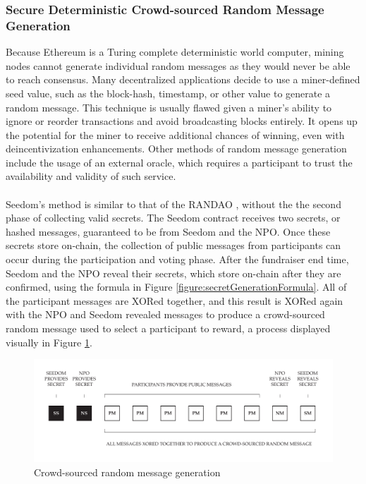 \documentclass[11pt]{article}
\begin{document}
\subsubsection{Secure Deterministic Crowd-sourced Random Message Generation}
\label{sec:secureDeterministicCrowdSourcedRandomMessageGeneration}

Because Ethereum is a Turing complete deterministic world computer, mining nodes cannot generate individual random messages as they would never be able to reach consensus. Many decentralized applications decide to use a miner-defined seed value, such as the block-hash, timestamp, or other value to generate a random message. This technique is usually flawed given a miner's ability to ignore or reorder transactions and avoid broadcasting blocks entirely. It opens up the potential for the miner to receive additional chances of winning, even with deincentivization enhancements. Other methods of random message generation include the usage of an external oracle, which requires a participant to trust the availability and validity of such service.\\\\
Seedom's method is similar to that of the RANDAO \cite{2}, without the the second phase of collecting valid secrets. The Seedom contract receives two secrets, or hashed messages, guaranteed to be from Seedom and the NPO. Once these secrets store on-chain, the collection of public messages from participants can occur during the participation and voting phase. After the fundraiser end time, Seedom and the NPO reveal their secrets, which store on-chain after they are confirmed, using the formula in Figure \ref{figure:secretGenerationFormula}. All of the participant messages are XORed together, and this result is XORed again with the NPO and Seedom revealed messages to produce a crowd-sourced random message used to select a participant to reward, a process displayed visually in Figure \ref{figure:crowdsourcedRandomMessageGeneration}.

\begin{figure}[H]
\begin{center}
\includegraphics[width=1.0\textwidth]{./graphics/crowd-sourced-random-message-generation.pdf}
\caption{Crowd-sourced random message generation}
\label{figure:crowdsourcedRandomMessageGeneration}
\end{center}
\end{figure}
\end{document}
